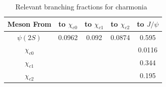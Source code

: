 \documentclass[aps,prc,preprint,superscriptaddress,showpacs,showkeys,amsmath]{revtex4-1}
\begin{document}
\begin{table}[h]
\caption{Relevant branching fractions for charmonia~\cite{Nakamura:2010zzi}}
\begin{tabular}{c|cccc}
Meson From &to $\chi_{c0}$ &to $\chi_{c1}$ &to $\chi_{c2}$ &to $J/\psi$\\ 
\hline
$\psi(2S)$ & 0.0962 & 0.092 & 0.0874 & 0.595   \\
$\chi_{c0}$& &  &  & 0.0116           \\
$\chi_{c1}$& &  &  & 0.344           \\
$\chi_{c2}$& &  &  & 0.195           \\
\end{tabular}
\label{table:CharmoniaBFs}
\end{table}

\end{document}
